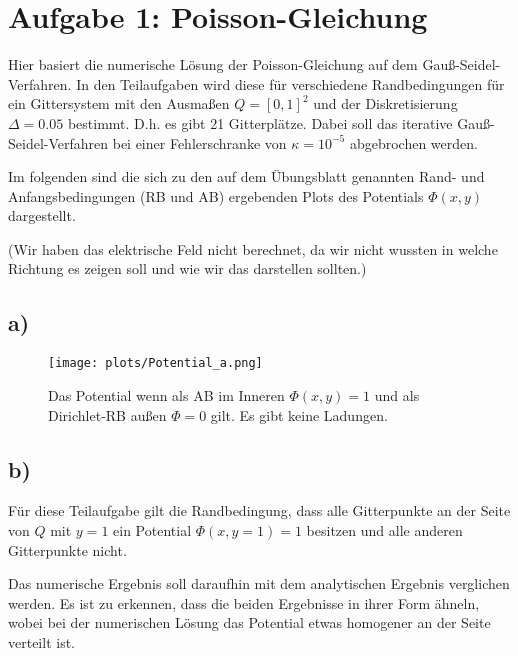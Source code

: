 \newpage
\section{Aufgabe 1: Poisson-Gleichung}
\label{sec:auf1}
Hier basiert die numerische Lösung der Poisson-Gleichung auf dem Gauß-Seidel-Verfahren.
In den Teilaufgaben wird diese für verschiedene Randbedingungen für ein Gittersystem mit den Ausmaßen $Q = [0, 1]^2$ und der Diskretisierung $\Delta = 0.05$ bestimmt. D.h. es gibt 21 Gitterplätze.
Dabei soll das iterative Gauß-Seidel-Verfahren bei einer Fehlerschranke von $\kappa = 10^{-5}$ abgebrochen werden.

Im folgenden sind die sich zu den auf dem Übungsblatt genannten Rand- und Anfangsbedingungen (RB und AB) ergebenden Plots des Potentials $\Phi(x, y)$ dargestellt.

(Wir haben das elektrische Feld nicht berechnet, da wir nicht wussten in welche Richtung es zeigen soll und wie wir das darstellen sollten.)

\subsection{a)}
    \vspace*{-2cm}
    \begin{figure}[H]
        \centering
        \texttt{[image: plots/Potential\_a.png]} \vspace*{-1cm}
        \caption{Das Potential wenn als AB im Inneren $\Phi(x,y)=1$ und als Dirichlet-RB außen $\Phi=0$ gilt. Es gibt keine Ladungen.}
        \label{fig:Potential_a}
    \end{figure}
    \FloatBarrier

\subsection{b)}
    Für diese Teilaufgabe gilt die Randbedingung, dass alle Gitterpunkte an der Seite von $Q$ mit $y=1$ ein Potential $\Phi(x, y=1) = 1$ besitzen und alle anderen Gitterpunkte nicht.

    Das numerische Ergebnis soll daraufhin mit dem analytischen Ergebnis verglichen werden.
    Es ist zu erkennen, dass die beiden Ergebnisse in ihrer Form ähneln, wobei bei der numerischen Lösung das Potential etwas homogener an der Seite verteilt ist.

